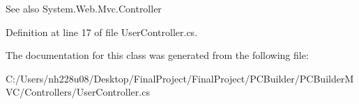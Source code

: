 \begin{DoxySeeAlso}{See also}
System.\+Web.\+Mvc.\+Controller


\end{DoxySeeAlso}


Definition at line 17 of file User\+Controller.\+cs.



The documentation for this class was generated from the following file\+:\begin{DoxyCompactItemize}
\item 
C\+:/\+Users/nh228u08/\+Desktop/\+Final\+Project/\+Final\+Project/\+P\+C\+Builder/\+P\+C\+Builder\+M\+V\+C/\+Controllers/User\+Controller.\+cs\end{DoxyCompactItemize}
